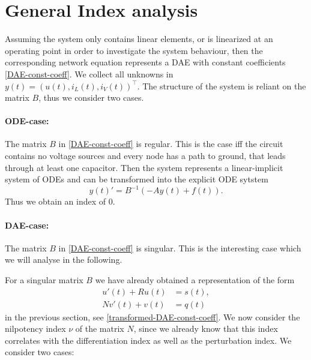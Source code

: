\section{General Index analysis}

Assuming the system only contains linear elements, or is linearized at an operating point in order to investigate the system behaviour, then the corresponding network equation represents a DAE with constant coefficients \eqref{DAE-const-coeff}. We collect all unknowns in $y(t)=(u(t), i_L(t), i_V(t))^\top$. The structure of the system is reliant on the matrix $B$, thus we consider two cases.

\paragraph{ODE-case:}
	The matrix $B$ in \eqref{DAE-const-coeff} is regular. This is the case iff the circuit contains no voltage sources and every node has a path to ground, that leads through at least one capacitor. Then the system represents a linear-implicit system of ODEs and can be transformed into the explicit ODE sytstem
	\begin{displaymath}
		y(t)'=B^{-1}(-Ay(t)+f(t)).
	\end{displaymath}
	Thus we obtain an index of $0$.
		
\paragraph{DAE-case:}
	The matrix $B$  in \eqref{DAE-const-coeff} is singular. This is the interesting case which we will analyse in the following.


For a singular matrix $B$ we have already obtained a representation of the form
\begin{align*}
	u'(t) + Ru(t) &= s(t), \\
	Nv'(t) + v(t) &= q(t)
\end{align*}
in the previous section, see \eqref{transformed-DAE-const-coeff}. We now consider the nilpotency index $\nu$ of the matrix $N$, since we already know that this index correlates with the differentiation index as well as the perturbation index. We consider two cases:

